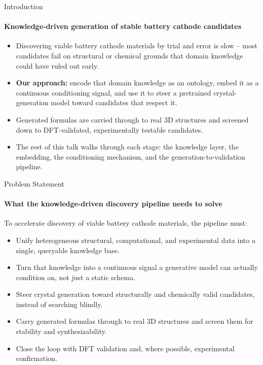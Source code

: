 \documentclass[aspectratio=169, 11pt]{beamer}
\begin{document}

\begin{frame}{Introduction}
\framesubtitle{Knowledge-driven generation of stable battery cathode candidates}
\footnotesize
\begin{itemize}\itemsep0.5em
    \item Discovering viable battery cathode materials by trial and error is slow -- most candidates fail on structural or chemical grounds that domain knowledge could have ruled out early.
    \item \textbf{Our approach:} encode that domain knowledge as an ontology, embed it as a continuous conditioning signal, and use it to steer a pretrained crystal-generation model toward candidates that respect it.
    \item Generated formulas are carried through to real 3D structures and screened down to DFT-validated, experimentally testable candidates.
    \item The rest of this talk walks through each stage: the knowledge layer, the embedding, the conditioning mechanism, and the generation-to-validation pipeline.
\end{itemize}
\end{frame}


\begin{frame}{Problem Statement}
\framesubtitle{What the knowledge-driven discovery pipeline needs to solve}
\footnotesize
To accelerate discovery of viable battery cathode materials, the pipeline must:
\begin{itemize}\itemsep0.5em
    \item Unify heterogeneous structural, computational, and experimental data into a single, queryable knowledge base.
    \item Turn that knowledge into a continuous signal a generative model can actually condition on, not just a static schema.
    \item Steer crystal generation toward structurally and chemically valid candidates, instead of searching blindly.
    \item Carry generated formulas through to real 3D structures and screen them for stability and synthesizability.
    \item Close the loop with DFT validation and, where possible, experimental confirmation.
\end{itemize}
\end{frame}
\end{document}
